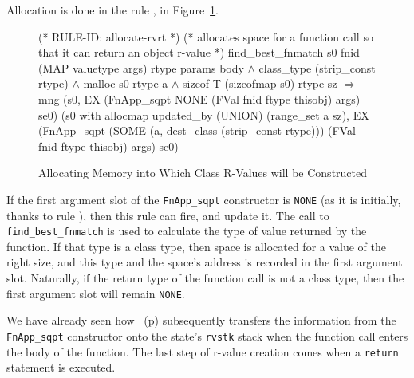 \documentclass[11pt]{article}
\begin{document}
Allocation is done in the rule , in
Figure~\ref{fig:allocate-rvrt}.
\begin{figure}[hbtp]
\begin{stdrule}
(* RULE-ID: allocate-rvrt *)
(* allocates space for a function call so that it can return an
   object r-value *)
     find_best_fnmatch s0 fnid (MAP valuetype args)
                       rtype params body \(\land\)
     class_type (strip_const rtype) \(\land\)
     malloc s0 rtype a \(\land\)
     sizeof T (sizeofmap s0) rtype sz
   \(\Rightarrow\)
     mng (s0, EX (FnApp_sqpt NONE
                             (FVal fnid ftype thisobj)
                             args)
                 se0)
         (s0 with allocmap updated_by (UNION) (range_set a sz),
          EX (FnApp_sqpt (SOME
                           (a, dest_class (strip_const rtype)))
                         (FVal fnid ftype thisobj)
                         args)
             se0)
\end{stdrule}
\caption[Allocating Memory for Class R-Values]{Allocating Memory into
  Which Class R-Values will be Constructed}
\label{fig:allocate-rvrt}
\end{figure}
If the first argument slot of the
\texttt{FnApp_sqpt} constructor
is \texttt{NONE} (as it is initially, thanks to rule
), then this rule can fire, and update it.
The call to \texttt{find_best_fnmatch} is used to calculate the type
of value returned by the function.  If that type is a class type, then
space is allocated for a value of the right size, and this type and
the space's address is recorded in the first argument slot.
Naturally, if the return type of the function call is not a class
type, then the first argument slot will remain \texttt{NONE}.

We have already seen how
~(p\pageref{fig:function-call}) subsequently
transfers the information from the \texttt{FnApp_sqpt} constructor
onto the state's \texttt{rvstk} stack %
%
when the function call enters the body of the function.  The last step
of r-value creation comes when a \texttt{return} statement is
executed.
\end{document}
